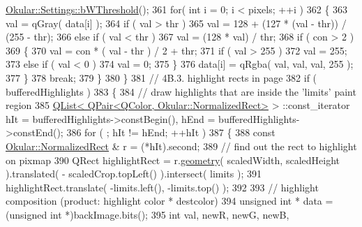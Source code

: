 \begin{DoxyCode}
      \hyperlink{classOkular_1_1Settings_a5246ad88486cd24b99606fcb063aa269}{Okular::Settings::bWThreshold}();
361                     \textcolor{keywordflow}{for}( \textcolor{keywordtype}{int} i = 0; i < pixels; ++i )
362                     \{
363                         val = qGray( data[i] );
364                         \textcolor{keywordflow}{if} ( val > thr )
365                             val = 128 + (127 * (val - thr)) / (255 - thr);
366                         \textcolor{keywordflow}{else} \textcolor{keywordflow}{if} ( val < thr )
367                             val = (128 * val) / thr;
368                         \textcolor{keywordflow}{if} ( con > 2 )
369                         \{
370                             val = con * ( val - thr ) / 2 + thr;
371                             \textcolor{keywordflow}{if} ( val > 255 )
372                                 val = 255;
373                             \textcolor{keywordflow}{else} \textcolor{keywordflow}{if} ( val < 0 )
374                                 val = 0;
375                         \}
376                         data[i] = qRgba( val, val, val, 255 );
377                     \}
378                     \textcolor{keywordflow}{break};
379             \}
380         \}
381         \textcolor{comment}{// 4B.3. highlight rects in page}
382         \textcolor{keywordflow}{if} ( bufferedHighlights )
383         \{
384             \textcolor{comment}{// draw highlights that are inside the 'limits' paint region}
385             \hyperlink{classQList}{QList< QPair<QColor, Okular::NormalizedRect>} >
      ::const\_iterator hIt = bufferedHighlights->constBegin(), hEnd = bufferedHighlights->constEnd();
386             \textcolor{keywordflow}{for} ( ; hIt != hEnd; ++hIt )
387             \{
388                 \textcolor{keyword}{const} \hyperlink{classOkular_1_1NormalizedRect}{Okular::NormalizedRect} & r = (*hIt).second;
389                 \textcolor{comment}{// find out the rect to highlight on pixmap}
390                 QRect highlightRect = r.\hyperlink{classOkular_1_1NormalizedRect_a006897c5fcff2c3a97b4141f1a967513}{geometry}( scaledWidth, scaledHeight ).translated( -
      scaledCrop.topLeft() ).intersect( limits );
391                 highlightRect.translate( -limits.left(), -limits.top() );
392 
393                 \textcolor{comment}{// highlight composition (product: highlight color * destcolor)}
394                 \textcolor{keywordtype}{unsigned} \textcolor{keywordtype}{int} * data = (\textcolor{keywordtype}{unsigned} \textcolor{keywordtype}{int} *)backImage.bits();
395                 \textcolor{keywordtype}{int} val, newR, newG, newB,

\end{DoxyCode}
